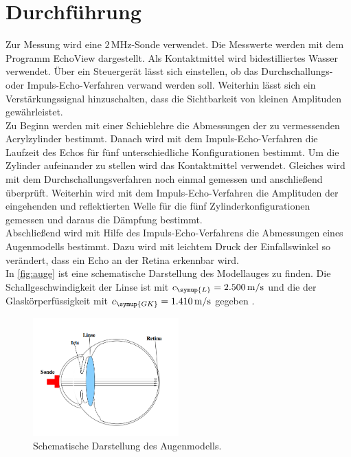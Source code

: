 \section{Durchführung}
\label{sec:Durchfuehrung}
Zur Messung wird eine $2\,\unit{\mega\hertz}$-Sonde verwendet. Die Messwerte werden mit dem Programm EchoView
dargestellt. Als Kontaktmittel wird bidestilliertes Wasser verwendet. Über ein Steuergerät lässt sich einstellen,
ob das Durchschallungs- oder Impuls-Echo-Verfahren verwand werden soll. Weiterhin lässt sich ein
Verstärkungssignal hinzuschalten, dass die Sichtbarkeit von kleinen Amplituden gewährleistet.\\
Zu Beginn werden mit einer Schieblehre die Abmessungen der zu vermessenden Acrylzylinder bestimmt. Danach wird mit
dem Impuls-Echo-Verfahren die Laufzeit des Echos für fünf unterschiedliche Konfigurationen bestimmt. Um die
Zylinder aufeinander zu stellen wird das Kontaktmittel verwendet. Gleiches wird mit dem Durchschallungsverfahren
noch einmal gemessen und anschließend überprüft. Weiterhin wird mit dem Impuls-Echo-Verfahren die
Amplituden der eingehenden und reflektierten Welle für die fünf Zylinderkonfigurationen gemessen und daraus die
Dämpfung bestimmt. \\
Abschließend wird mit Hilfe des Impuls-Echo-Verfahrens die Abmessungen eines Augenmodells
bestimmt. Dazu wird mit leichtem Druck der Einfallswinkel so verändert, dass ein Echo an der Retina erkennbar
wird.\\
In \autoref{fig:auge} ist eine schematische Darstellung des Modellauges zu finden. Die
Schallgeschwindigkeit der Linse ist mit $c_{\symup{L}} = 2.500\,\unit{\meter\per\second}$ und die der
Glaskörperfüssigkeit mit $c_{\symup{GK}} = 1.410\,\unit{\meter\per\second}$ gegeben \cite{sample}.

\begin{figure}
    \centering
    \includegraphics[width=0.5\textwidth]{messwerte/Versuchsaufbau.png}
    \caption{Schematische Darstellung des Augenmodells.}
    \label{fig:auge}
\end{figure}